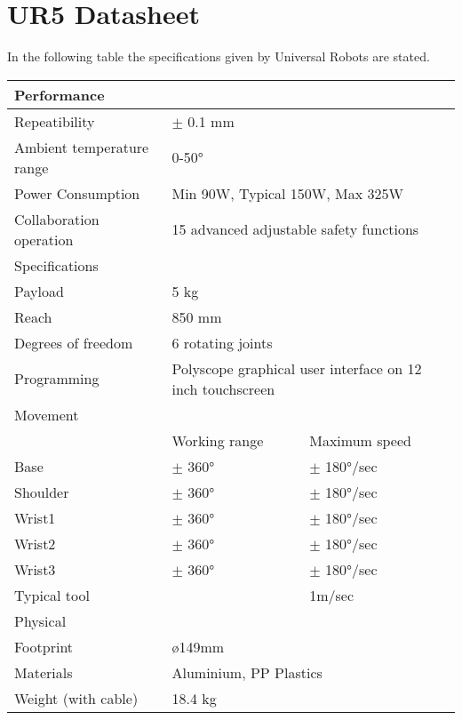 
\section{UR5 Datasheet}
\label{AppB}
In the following table the specifications given by Universal Robots are stated. 
\begin{table}
	\begin{tabular}{p{4cm} | p{3cm} p{3cm}}
		\hline
		Performance & \multicolumn{2}{l}{ } \\
		\hline \hline
		Repeatibility & \multicolumn{2}{l}{$\pm$ 0.1 mm} \\
		Ambient temperature range & \multicolumn{2}{l}{0-50°} \\
		Power Consumption  & \multicolumn{2}{l}{Min 90W, Typical 150W, Max 325W} \\
		Collaboration operation & \multicolumn{2}{l}{15 advanced adjustable safety functions} \\
		\hline \hline
		Specifications & \multicolumn{2}{l}{ }\\
		\hline \hline 
		Payload & \multicolumn{2}{l}{5 kg} \\
		Reach & \multicolumn{2}{l}{850 mm} \\
		Degrees of freedom & \multicolumn{2}{l}{6 rotating joints} \\
		Programming & \multicolumn{2}{l}{Polyscope graphical user interface on 12 inch touchscreen} \\
		\hline \hline
		Movement & & \\
		\hline 
		& Working range & Maximum speed \\
		\hline \hline
		Base & $\pm$ 360°  & $\pm$ 180°/sec \\
		Shoulder & $\pm$ 360° & $\pm$ 180°/sec \\
		Wrist1 & $\pm$ 360° & $\pm$ 180°/sec \\
		Wrist2 & $\pm$ 360° & $\pm$ 180°/sec \\
		Wrist3 & $\pm$ 360° & $\pm$ 180°/sec \\
		Typical tool & & 1m/sec \\
		\hline \hline
		Physical & \multicolumn{2}{l}{ }\\
		\hline \hline
		Footprint & \multicolumn{2}{l}{\o 149mm} \\
		Materials & \multicolumn{2}{l}{Aluminium, PP Plastics} \\
		Weight (with cable) & 18.4 kg 
	\end{tabular}
\end{table}